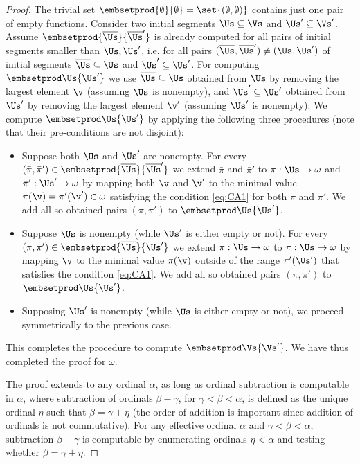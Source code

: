 \begin{proof}
The trivial set $\embsetprod {\emptyset} {\emptyset} = \set{(\emptyset,\emptyset)}$ 
contains just one pair of empty functions.
Consider two initial segments $\Us \subseteq \Vs$ and
$\Us' \subseteq \Vs'$.
Assume $\embsetprod {\overline\Us}{\overline\Us'}$ is already computed for all pairs of initial segments 
smaller than 
$\Us, \Us'$,
i.e. for all pairs
$(\overline\Us,\overline\Us') \neq (\Us,\Us')$ of initial segments $\overline\Us\subseteq \Us$ 
and $\overline\Us'\subseteq \Us'$.
For computing $\embsetprod \Us{\Us'}$ we use $\overline\Us\subseteq \Us$ obtained from $\Us$ 
by removing the largest element $\v$ (assuming $\Us$ is nonempty),
and $\overline\Us'\subseteq \Us'$ obtained from $\Us'$ by removing the largest element $\v'$
(assuming $\Us'$ is nonempty).
We compute $\embsetprod \Us{\Us'}$ by applying the following three procedures
(note that their pre-conditions are not disjoint):
%
\begin{itemize}
\item
Suppose both $\Us$ and $\Us'$ are nonempty.
For every $(\bar\pi, \bar\pi') \in \embsetprod {\overline\Us}{\overline\Us'}$ we extend $\bar\pi$ and $\bar\pi'$ 
to $\pi : \Us \to \omega$ and $\pi' : \Us'\to\omega$ by mapping both $\v$ and $\v'$ to
the minimal
value $\pi(\v) = \pi'(\v')\in\omega$ satisfying the condition \eqref{eq:CA1} for both $\pi$ and $\pi'$.
We add all so obtained pairs $(\pi, \pi')$ to $\embsetprod \Us{\Us'}$.
\item
Suppose $\Us$ is nonempty (while $\Us'$ is either empty or not).
For every $(\bar\pi, \pi') \in \embsetprod {\overline\Us}{\Us'}$ we extend 
$\bar\pi : \overline\Us \to\omega$ to $\pi : \Us \to \omega$
by mapping $\v$ to the minimal value $\pi(\v)$ outside of the range $\pi'(\Us')$ that satisfies the condition \eqref{eq:CA1}.
We add all so obtained pairs $(\pi, \pi')$ to $\embsetprod \Us{\Us'}$.
\item
Supposing $\Us'$ is nonempty  (while $\Us$ is either empty or not), we proceed symmetrically to the previous case.
\end{itemize}
This completes the procedure to compute $\embsetprod \Vs{\Vs'}$.
We have thus completed the proof for $\omega$.
\smallskip

\label{para:comp ord}
The proof extends to any ordinal $\alpha$, as long as
ordinal subtraction is computable in $\alpha$, where subtraction of
ordinals $\beta - \gamma$, for $\gamma < \beta < \alpha$,
is defined as the unique ordinal $\eta$ such that 
$\beta = \gamma + \eta$ (the order of addition is important since addition of ordinals is not commutative).
For any effective ordinal $\alpha$ and $\gamma<\beta<\alpha$, subtraction $\beta - \gamma$
is computable by enumerating ordinals $\eta<\alpha$ and testing whether $\beta=\gamma + \eta$.
\end{proof}
